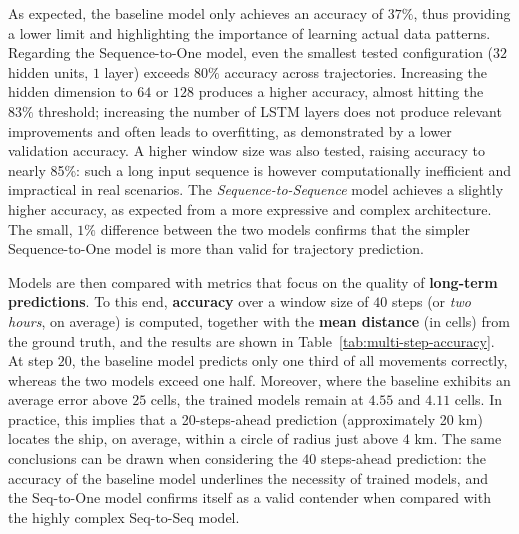 \documentclass{article}
\begin{document}
As expected, the baseline model only achieves an accuracy of $37\%$, thus providing a lower limit and highlighting the importance of learning actual data patterns. Regarding the Sequence-to-One model, even the smallest tested configuration ($32$ hidden units, $1$ layer) exceeds $80\%$ accuracy across trajectories. Increasing the hidden dimension to $64$ or $128$ produces a higher accuracy, almost hitting the $83\%$ threshold; increasing the number of LSTM layers does not produce relevant improvements and often leads to overfitting, as demonstrated by a lower validation accuracy. A higher window size was also tested, raising accuracy to nearly 85\%: such a long input sequence is however computationally inefficient and impractical in real scenarios. The \textit{Sequence-to-Sequence} model achieves a slightly higher accuracy, as expected from a more expressive and complex architecture. The small, $1\%$ difference between the two models confirms that the simpler Sequence-to-One model is more than valid for trajectory prediction.


Models are then compared with metrics that focus on the quality of \textbf{long-term predictions}. To this end, \textbf{accuracy} over a window size of $40$ steps (or \textit{two hours}, on average) is computed, together with the \textbf{mean distance} (in cells) from the ground truth, and the results are shown in Table~\ref{tab:multi-step-accuracy}. At step $20$, the baseline model predicts only one third of all movements correctly, whereas the two models exceed one half. Moreover, where the baseline exhibits an average error above $25$ cells, the trained models remain at $4.55$ and $4.11$ cells. In practice, this implies that a 20-steps-ahead prediction (approximately 20 km) locates the ship, on average, within a circle of radius just above $4$ km. The same conclusions can be drawn when considering the $40$ steps-ahead prediction: the accuracy of the baseline model underlines the necessity of trained models, and the Seq-to-One model confirms itself as a valid contender when compared with the highly complex Seq-to-Seq model.
\end{document}
